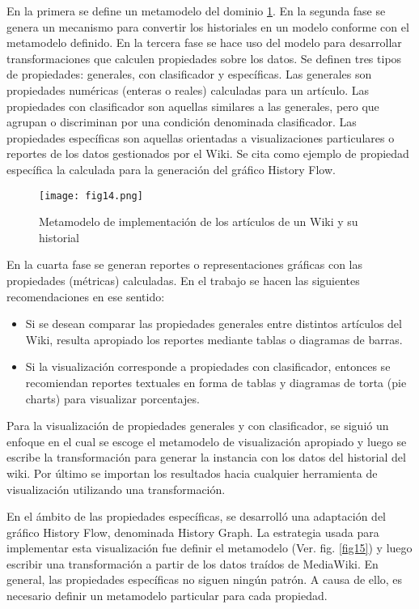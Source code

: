 En la primera se define un metamodelo del dominio \ref{fig14}. En la segunda fase se genera un mecanismo para convertir los historiales en un modelo conforme con el metamodelo definido. En la tercera fase se hace uso del modelo para desarrollar transformaciones que calculen propiedades sobre los datos. Se definen tres tipos de propiedades: generales, con clasificador y específicas. Las generales son propiedades numéricas (enteras o reales) calculadas para un artículo. Las propiedades con clasificador son aquellas similares a las generales, pero que agrupan o discriminan por una condición denominada clasificador. Las propiedades específicas son aquellas orientadas a visualizaciones particulares o reportes de los datos gestionados por el Wiki. Se cita como ejemplo de propiedad específica la calculada para la generación del gráfico History Flow.

\begin{figure}[htp]
  \centering
  \texttt{[image: fig14.png]}
  \caption{Metamodelo de implementación de los artículos de un Wiki y su historial \cite[Fig. 2]{Sca08}}
  \label{fig14}
\end{figure}

En la cuarta fase se generan reportes o representaciones gráficas con las propiedades (métricas) calculadas. En el trabajo se hacen las siguientes recomendaciones en ese sentido:

\begin{itemize}
  \item Si se desean comparar las propiedades generales entre distintos artículos del Wiki, resulta apropiado los reportes mediante tablas o diagramas de barras.
  \item Si la visualización corresponde a propiedades con clasificador, entonces se recomiendan reportes textuales en forma de tablas y diagramas de torta (pie charts) para visualizar porcentajes.
\end{itemize}

Para la visualización de propiedades generales y con clasificador, se siguió un enfoque en el cual se escoge el metamodelo de visualización apropiado y luego se escribe la transformación para generar la instancia con los datos del historial del wiki. Por último se importan los resultados hacia cualquier herramienta de visualización utilizando una transformación.

En el ámbito de las propiedades específicas, se desarrolló una adaptación del gráfico History Flow, denominada History Graph. La estrategia usada para implementar esta visualización fue definir el metamodelo (Ver. fig. \ref{fig15}) y luego escribir una transformación a partir de los datos traídos de MediaWiki. En general, las propiedades específicas no siguen ningún patrón. A causa de ello, es necesario definir un metamodelo particular para cada propiedad.

